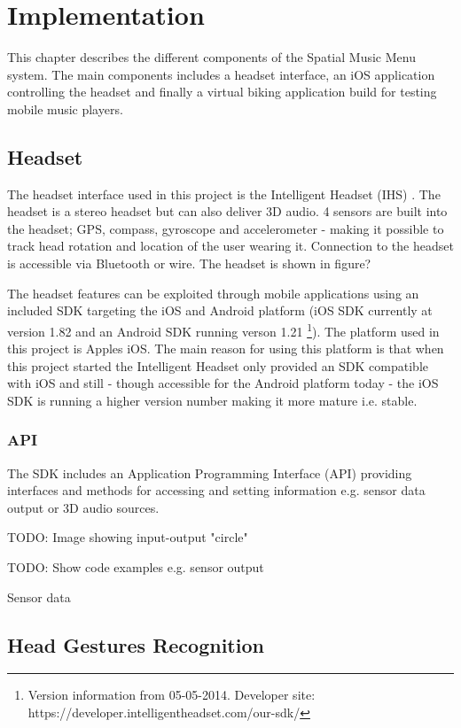 \chapter{Implementation}
This chapter describes the different components of the Spatial Music Menu system. The main components includes a headset interface, an iOS application controlling the headset and finally a virtual biking application build for testing mobile music players.

\section{Headset}
The headset interface used in this project is the Intelligent Headset (IHS) \cite{gn_store_nord_intelligent_2013}. The headset is a stereo headset but can also deliver 3D audio. 4 sensors are built into the headset; GPS, compass, gyroscope and accelerometer - making it possible to track head rotation and location of the user wearing it. Connection to the headset is accessible via Bluetooth or wire. The headset is shown in figure?

The headset features can be exploited through mobile applications using an included SDK targeting the iOS and Android platform (iOS SDK currently at version 1.82 and an Android SDK running verson 1.21 \footnote{Version information from 05-05-2014. Developer site: https://developer.intelligentheadset.com/our-sdk/}). The platform used in this project is Apples iOS. The main reason for using this platform is that when this project started the Intelligent Headset only provided an SDK compatible with iOS and still - though accessible for the Android platform today - the iOS SDK is running a higher version number making it more mature i.e. stable.

\subsection{API}
The SDK includes an Application Programming Interface (API) providing interfaces and methods for accessing and setting information e.g. sensor data output or 3D audio sources.

TODO: Image showing input-output "circle"

TODO: Show code examples e.g. sensor output

Sensor data

\section{Head Gestures Recognition}

